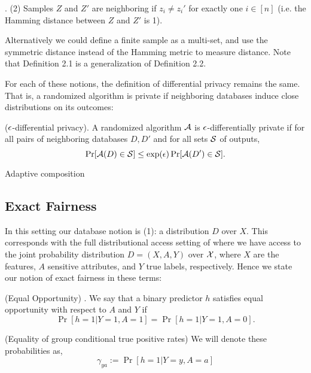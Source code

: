 \begin{defn} \cite{Kasiviswanathan:2011:WLP:2078965.2078976}.
  (2) Samples $Z$ and $Z'$ are neighboring if $z_i \neq z_i'$ for
  exactly one $i \in [n]$ (i.e. the Hamming distance between $Z$ and
  $Z'$ is 1).
\end{defn}
Alternatively we could define a finite sample as a multi-set, and use
the symmetric distance instead of the Hamming metric to measure
distance. Note that Definition 2.1 is a generalization of Definition
2.2.

For each of these notions, the definition of differential privacy
remains the same. That is, a randomized algorithm is private if
neighboring databases induce close distributions on its outcomes:

\begin{defn}
  ($\eps$-differential privacy). \cite{dpbook} A randomized algorithm
    $\A$ is $\eps$-differentially private if for all pairs of
    neighboring databases $D,D'$ and for all sets $\S$ of outputs,
    $$\Pr[\A(D)\in \S] \leq \exp(\eps)\Pr[\A(D')\in \S].$$
\end{defn}

\begin{theorem} Adaptive composition
\end{theorem}

\subsection{Exact Fairness}

In this setting our database notion is (1): a distribution $D$ over
$X$. This corresponds with the full distributional access setting of
\cite{hardteqop} where we have access to the joint probability
distribution $D = (X, A, Y)$ over $\X$, where $X$ are the features, $A$
sensitive attributes, and $Y$ true labels, respectively. Hence we state
our notion of exact fairness in these terms:

\begin{defn}
  (Equal Opportunity) \cite{hardteqop}. We say that a binary predictor $h$ satisfies
    equal opportunity with respect to $A$ and $Y$ if
    $$\Pr[h = 1 | Y=1, A=1] = \Pr[h = 1 | Y=1, A=0].$$

   	(Equality of group conditional true positive rates) We will denote these probabilities as,
   	$$\gamma_{ya} := \Pr[h = 1 | Y=y, A=a]$$
\end{defn}

